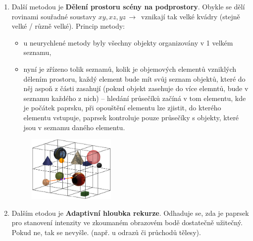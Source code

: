 \begin{enumerate}
\begin{figure}[H]
\end{figure}
\item Další metodou je \textbf{Dělení prostoru scény na podprostory}. Obykle se dělí rovinami souřadné soustavy $xy, xz, yz \,\to\,$ vznikají tak velké kvádry (stejně velké / různě velké). Princip metody:
\begin{itemize}
	\item u neurychlené metody byly všechny objekty organizovány v 1 velkém seznamu,
	\item nyní je zřízeno tolik seznamů, kolik je objemových elementů vzniklých dělením prostoru, každý element bude mít svůj seznam objektů, které do něj aspoň z části zasahují (pokud objekt zasehuje do více elemntů, bude v seznamu každého z nich) -- hledání průsečíků začíná v tom elementu, kde je počátek paprsku, při opouštění elementu lze zjistit, do kterého elementu vstupuje, paprsek kontroluje pouze průsečíky s objekty, které jsou v seznamu daného elementu.
\end{itemize}
\begin{figure}[H]
\centering
\includegraphics[width=0.4\textwidth]{assets/6_deleni_podprostor}
\end{figure}
\item Dalším etodou je \textbf{Adaptivní hloubka rekurze}. Odhaduje se, zda je paprsek pro stanovení intenzity ve zkoumaném obrazovém bodě dostatečně užitečný. Pokud ne, tak se nevyšle. (např. u odrazů či průchodů tělesy).
\end{enumerate}
